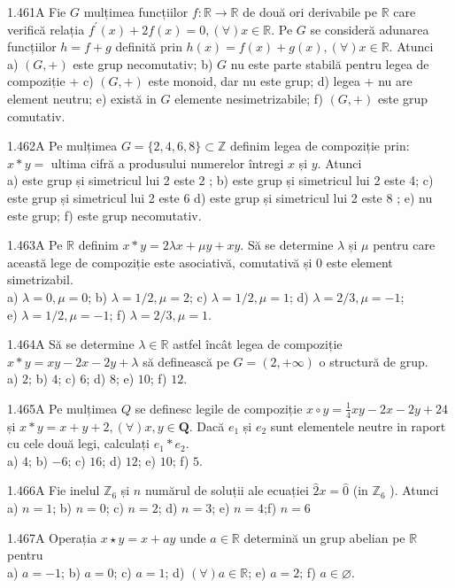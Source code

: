 \documentclass[11pt]{article}
\begin{document}
1.461A Fie $G$ mulțimea funcțiilor $f: \mathbb{R} \rightarrow \mathbb{R}$ de două ori derivabile pe $\mathbb{R}$ care verifică relația $f^{\prime}(x)+2 f(x)=0,(\forall) x \in \mathbb{R}$. Pe $G$ se consideră adunarea funcțiilor $h=f+g$ definită prin $h(x)=f(x)+g(x),(\forall) x \in \mathbb{R}$. Atunci\\ a) $(G,+)$ este grup necomutativ; b) $G$ nu este parte stabilă pentru legea de compoziție + c) $(G,+)$ este monoid, dar nu este grup; d) legea + nu are element neutru; e) există in $G$ elemente nesimetrizabile; f) $(G,+)$ este grup comutativ.

1.462A Pe mulțimea $G=\{2,4,6,8\} \subset \mathbb{Z}$ definim legea de compoziție prin: $x * y=$ ultima cifră a produsului numerelor întregi $x$ și $y$. Atunci\\ a) este grup și simetricul lui 2 este 2 ; b) este grup și simetricul lui 2 este 4; c) este grup și simetricul lui 2 este 6 d) este grup și simetricul lui 2 este 8 ; e) nu este grup; f) este grup necomutativ.

1.463A Pe $\mathbb{R}$ definim $x * y=2 \lambda x+\mu y+x y$. Să se determine $\lambda$ și $\mu$ pentru care această lege de compoziție este asociativă, comutativă și 0 este element simetrizabil.\\ a) $\lambda=0, \mu=0$; b) $\lambda=1 / 2, \mu=2$; c) $\lambda=1 / 2, \mu=1$; d) $\lambda=2 / 3, \mu=-1$;\\ e) $\lambda=1 / 2, \mu=-1$; f) $\lambda=2 / 3, \mu=1$.

1.464A Să se determine $\lambda \in \mathbb{R}$ astfel încât legea de compoziție $x * y=x y-2 x-2 y+\lambda$ să definească pe $G=(2,+\infty)$ o structură de grup.\\ a) $2$; b) $4$; c) $6$; d) $8$; e) $10$; f) $12$.

1.465A Pe mulțimea $Q$ se definesc legile de compoziție $x \circ y=\frac{1}{4} x y-2 x-2 y+24$ și $x * y=x+y+2,(\forall) x, y \in \mathbf{Q}$. Dacă $e_{1}$ și $e_{2}$ sunt elementele neutre in raport cu cele două legi, calculați $e_{1} * e_{2}$.\\ a) $4$; b) $-6$; c) $16$; d) $12$; e) $10$; f) $5$.

1.466A Fie inelul $\mathbb{Z}_{6}$ și $n$ numărul de soluții ale ecuației $\hat{2} x=\hat{0}$ (in $\mathbb{Z}_{6}$ ). Atunci\\ a) $n=1$; b) $n=0$; c) $n=2$; d) $n=3$; e) $n=4$;f) $n=6$

1.467A Operația $x \star y=x+a y$ unde $a \in \mathbb{R}$ determină un grup abelian pe $\mathbb{R}$ pentru\\ a) $a=-1$; b) $a=0$; c) $a=1$; d) $(\forall) a \in \mathbb{R}$; e) $a=2$; f) $a \in \varnothing$.
\end{document}
